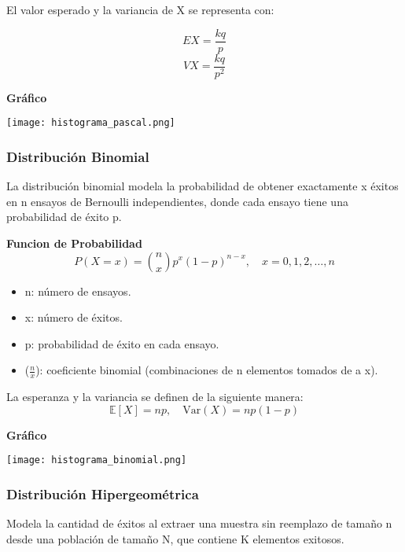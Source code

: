 \documentclass[11pt]{article}
\begin{document}
  El valor esperado y la variancia de X se representa con:

  \begin{equation}
    EX = \frac{kq}{p}
  \end{equation}
  \begin{equation}
    VX = \frac{kq}{p^2}
  \end{equation}

\noindent\textbf{Gráfico\newline}
\begin{center}
\texttt{[image: histograma\_pascal.png]}
\end{center}
  

\subsubsection{Distribución Binomial}
La distribución binomial modela la probabilidad de obtener exactamente x éxitos en n ensayos de Bernoulli independientes, donde cada ensayo tiene una probabilidad de éxito p.

\noindent\textbf{Funcion de Probabilidad\newline}
\[
P(X = x) = \binom{n}{x} p^x (1 - p)^{n - x}, \quad x = 0, 1, 2, \dots, n
\]
\begin{itemize}
    \item n: número de ensayos.
    \item x: número de éxitos.
    \item p: probabilidad de éxito en cada ensayo. 
    \item ($\frac{n}{x}$): coeficiente binomial (combinaciones de n elementos tomados de a x).
\end{itemize}
La esperanza y la variancia se definen de la siguiente manera:
\[
\mathbb{E}[X] = np, \quad \text{Var}(X) = np(1 - p)
\]

\noindent\textbf{Gráfico\newline}
\begin{center}
\texttt{[image: histograma\_binomial.png]}
\end{center}

\subsubsection{Distribución Hipergeométrica}
Modela la cantidad de éxitos al extraer una muestra sin reemplazo de tamaño n desde una población de tamaño N, que contiene K elementos exitosos.
\end{document}
